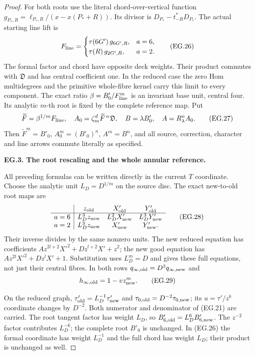 \begin{proof}
For both roots use the literal chord-over-vertical function
\(g_{P_*,R}=\ell_{P_*,R}/(x-x(P_*+R))\).
Its divisor is \(D_{P_*}-t_{-R}^*D_{P_*}\).
The actual starting line lift is
\[
 F_{\rm line}=
 \begin{cases}
 \tau(6G')\,g_{6G',R},& a=6,\\
 \tau(R)\,g_{2G',R},& a=2 .
 \end{cases}
 \tag{EG.26}
\]
The formal factor and chord have opposite deck weights.
Their product commutes with \(\mathfrak D\) and has
central coefficient one. In the reduced case the zero
Hom multidegrees and the primitive whole-fibre kernel
carry this limit to every component. The exact ratio
\(\beta=B'_0/F_{\rm line}^m\) is an invariant base unit,
central four. Its analytic \(m\)-th root is fixed by the
complete reference map. Put
\[
 \widetilde F=\beta^{1/m}F_{\rm line},\quad
 A_0=\zeta_m^d\widetilde F^{\,n}\mathfrak D,\quad
 B=\lambda B'_0,\quad A=R_\lambda^nA_0 .
 \tag{EG.27}
\]
Then \(\widetilde F^m=B'_0\), \(A_0^m=(B'_0)^n\),
\(A^m=B^n\), and all source, correction, character and
line arrows commute literally as specified.

\par\medskip\noindent\textbf{EG.3. The root rescaling and the whole annular reference.}\par\nopagebreak[4]

All preceding formulas can be written directly in the
current \(T\) coordinate. Choose the analytic unit
\(L_D=D^{1/m}\) on the source disc. The exact new-to-old
root maps are
\[
 \begin{array}{c|ccc}
 &z_{\rm old}&X'_{\rm old}&Y'_{\rm old}\\ \hline
 a=6&L_D^3 z_{\rm new}&L_D^2X'_{\rm new}&L_D^3Y'_{\rm new}\\
 a=2&L_D^3 z_{\rm new}&X'_{\rm new}&Y'_{\rm new}.
 \end{array}
 \tag{EG.28}
\]
Their inverse divides by the same nonzero units. The
new reduced equation has coefficients
\(A z^{2l+2}X'^2+D z^{l+2}X'+z^2\);
the new good equation has
\(A z^{2l}X'^2+D z^lX'+1\).
Substitution uses \(L_D^m=D\) and gives these full
equations, not just their central fibres. In both rows
\(q_{\infty,\rm old}=D^3 q_{\infty,\rm new}\) and
\[
 h_{\infty,\rm old}=1-vz_{\rm new}^m .
 \tag{EG.29}
\]

On the reduced graph,
\(\tau'_{\rm old}=L_D^{-1}\tau'_{\rm new}\) and
\(\tau_{0,\rm old}=D^{-2}\tau_{0,\rm new}\);
its \(u=\tau'/z^k\) coordinate changes by \(D^{-2}\).
Both numerator and denominator of (EG.21) are carried.
The root tangent factor has weight \(L_D\), so
\(B'_{6,\rm old}=L_D^6 B'_{6,\rm new}\).
The \(z^{-2}\) factor contributes \(L_D^{-6}\);
the complete root \(B'_0\) is unchanged.
In (EG.26) the formal coordinate has weight
\(L_D^{-1}\) and the full chord has weight \(L_D\);
their product is unchanged as well.


\end{proof}
